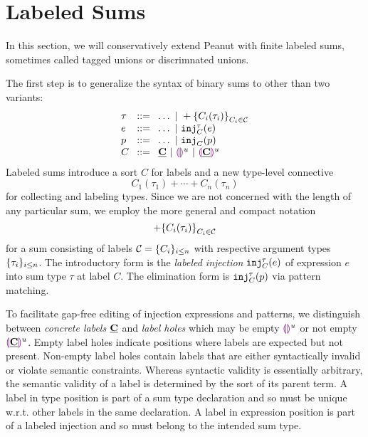 \section{Labeled Sums}\label{sec:labeledsums}

In this section, we will conservatively extend Peanut with finite labeled sums,
sometimes called tagged unions or discrimnated unions.

The first step is to generalize the syntax of binary sums to other than two variants:
\[
  \arraycolsep=4pt\begin{array}{lll}
    \tau & ::= & \ldots ~\vert~ \tlabeledsum{C_i(\tau_i)}_{C_i \in \tagset} \\
    e    & ::= & \ldots ~\vert~ \hinj{C}{\tau}{e}                           \\
    p    & ::= & \ldots ~\vert~ \hinjp{C}{p}                                \\
    C    & ::= & \tagC ~\vert~ \tagehole{u} ~\vert~ \taghole{\tagC}{u}
  \end{array}
\]
Labeled sums introduce a sort $C$ for labels and a new type-level connective
\[ C_1(\tau_1) + \cdots + C_n(\tau_n) \]
for collecting and labeling types.
Since we are not concerned with the length of any particular sum,
we employ the more general and compact notation
\[+\mathopen{}\left\{C_i(\tau_i)\right\}_{C_i \in \mathcal{C}}\]
for a sum consisting of labels $\mathcal{C} = \{C_i\}_{i \leq n}$ with respective argument types $\{\tau_i\}_{i \leq n}$.
The introductory form is the \emph{labeled injection} $\mathtt{inj}_{C}^{\tau}({e})$ of expression $e$ into sum type $\tau$ at label $C$.
The elimination form is $\mathtt{inj}_{C}^{\tau}({p})$ via pattern matching.

To facilitate gap-free editing of injection expressions and patterns, we distinguish between \emph{concrete labels} $\underline{\mathbf{C}}$
and \emph{label holes} which may be empty $\textcolor{violet}{\llparenthesis}\textcolor{violet}{\rrparenthesis}^{u}$ or not empty $\textcolor{violet}{\llparenthesis}\underline{\mathbf{C}}\textcolor{violet}{\rrparenthesis}^{u}$.
Empty label holes indicate positions where labels are expected but not present.
Non-empty label holes contain labels that are either syntactically invalid or violate semantic constraints.
Whereas syntactic validity is essentially arbitrary, the semantic validity of a label is determined by the sort of its parent term.
A label in type position is part of a sum type declaration and so must be unique w.r.t. other labels in the same declaration.
A label in expression position is part of a labeled injection and so must belong to the intended sum type.


